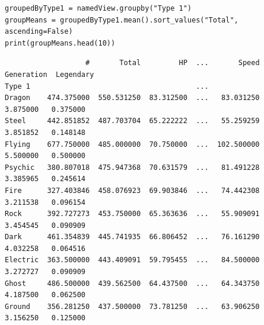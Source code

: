 \begin{frame}[fragile]
%
\begin{codebox}
\begin{verbatim}
groupedByType1 = namedView.groupby("Type 1")
groupMeans = groupedByType1.mean().sort_values("Total", ascending=False)
print(groupMeans.head(10))
\end{verbatim}
\end{codebox}
%
\begin{cmdbox}
\begin{verbatim}
                   #       Total         HP  ...       Speed  Generation  Legendary
Type 1                                       ...                                   
Dragon    474.375000  550.531250  83.312500  ...   83.031250    3.875000   0.375000
Steel     442.851852  487.703704  65.222222  ...   55.259259    3.851852   0.148148
Flying    677.750000  485.000000  70.750000  ...  102.500000    5.500000   0.500000
Psychic   380.807018  475.947368  70.631579  ...   81.491228    3.385965   0.245614
Fire      327.403846  458.076923  69.903846  ...   74.442308    3.211538   0.096154
Rock      392.727273  453.750000  65.363636  ...   55.909091    3.454545   0.090909
Dark      461.354839  445.741935  66.806452  ...   76.161290    4.032258   0.064516
Electric  363.500000  443.409091  59.795455  ...   84.500000    3.272727   0.090909
Ghost     486.500000  439.562500  64.437500  ...   64.343750    4.187500   0.062500
Ground    356.281250  437.500000  73.781250  ...   63.906250    3.156250   0.125000
\end{verbatim}
\end{cmdbox}
%
\end{frame}


